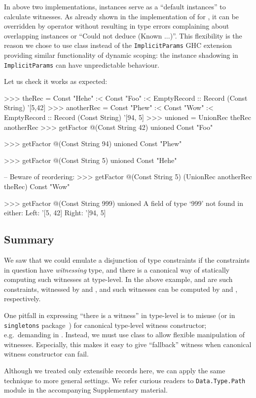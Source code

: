 \documentclass[demotion-paper.tex]{subfiles}
\begin{document}
In above two implementations,  instances serve as a ``default instances'' to calculate witnesses.
As already shown in the implementation of  for , it can be overridden by  operator without resulting in type errors complaining about overlapping instances or ``Could not deduce (Known ...)''.
This flexibility is the reason we chose to use  class instead of the \texttt{ImplicitParams} GHC extension providing similar functionality of dynamic scoping:  the instance shadowing in \texttt{ImplicitParams} can have unpredictable behaviour.

Let us check it works as expected:

\begin{repl}
>>> theRec = Const "Hehe" :< Const "Foo"
      :< EmptyRecord
      :: Record (Const String) '[5,42]
>>> anotherRec = Const "Phew" :< Const "Wow"
      :< EmptyRecord
      :: Record (Const String) '[94, 5]
>>> unioned = UnionRec theRec anotherRec
>>> getFactor @(Const String 42) unioned
Const "Foo"

>>> getFactor @(Const String 94) unioned
Const "Phew"

>>> getFactor @(Const String 5) unioned
Const "Hehe"

-- Beware of reordering:
>>> getFactor @(Const String 5) 
      (UnionRec anotherRec theRec)
Const "Wow"

>>> getFactor @(Const String 999) unioned
A field of type `999' not found in either:
   Left: '[5, 42]
  Right: '[94, 5]
\end{repl}

\subsection{Summary}
We saw that we could emulate a disjunction of type constraints if the constraints in question have \emph{witnessing} type, and there is a canonical way of statically computing such witnesses at type-level.
In the above example,  and  are such constraints, witnessed by  and , and such witnesses can be computed by  and , respectively.

One pitfall in expressing ``there is a witness'' in type-level is to misuse  (or  in \texttt{singletons} package~\cite{singletons}) for canonical type-level witness constructor; e.g.\ demanding  in .
Instead, we must use  class to allow flexible manipulation of witnesses.
Especially, this makes it easy to give ``fallback'' witness when canonical witness constructor can fail.

Although we treated only extensible records here, we can apply the same technique to more general settings.
We refer curious readers to \texttt{Data.Type.Path} module in the accompanying Supplementary material. 
\end{document}
